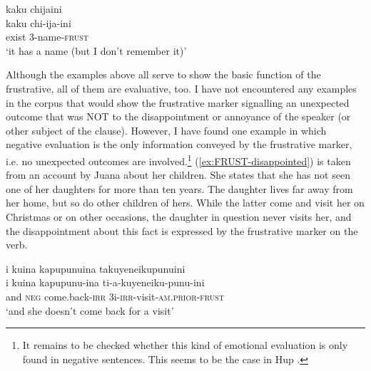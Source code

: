 \ea\label{ex:FRUST-VAIN-3}
\begingl 
\glpreamble kaku chijaini\\
\gla kaku chi-ija-ini\\ 
\glb exist 3-name-\textsc{frust}\\ 
\glft ‘it has a name (but I don’t remember it)’\\ 
\endgl
\trailingcitation{[jxx-a120516l-a.233]}
\xe


Although the examples above all serve to show the basic function of the frustrative, all of them are evaluative, too. I have not encountered any examples in the corpus that would show the frustrative marker  signalling an unexpected outcome that was NOT to the disappointment or annoyance of the speaker (or other subject of the clause). However, I have found one example in which negative evaluation is the only information conveyed by the frustrative marker, i.e. no unexpected outcomes are involved.\footnote{It remains to be checked whether this kind of emotional evaluation is only found in negative sentences. This seems to be the case in Hup \citep[cf.][878]{Epps2008}.} (\ref{ex:FRUST-disappointed}) is taken from an account by Juana about her children. She states that she has not seen one of her daughters for more than ten years. The daughter lives far away from her home, but so do other children of hers. While the latter come and visit her on Christmas or on other occasions, the daughter in question never visits her, and the disappointment about this fact is expressed by the frustrative marker on the verb.

\ea\label{ex:FRUST-disappointed}
\begingl 
\glpreamble i kuina kapupunuina takuyeneikupunuini\\
\gla i kuina kapupunu-ina ti-a-kuyeneiku-punu-ini\\ 
\glb and \textsc{neg} come.back-\textsc{irr} 3i-\textsc{irr}-visit-\textsc{am.prior}-\textsc{frust}\\ 
\glft ‘and she doesn’t come back for a visit’\\ 
\endgl
\trailingcitation{[jxx-p120430l-1.313]}
\xe



